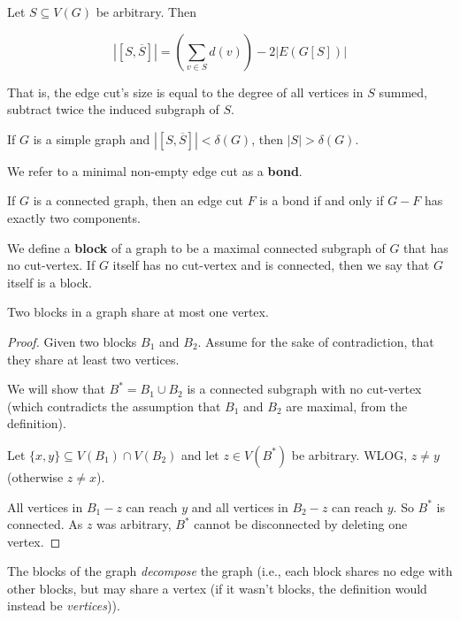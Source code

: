 \begin{proposition}
	Let $S \subseteq V(G)$ be arbitrary. Then

	\begin{equation*}
		|[S, \overline{S}]| = \left( \sum_{v \in S} d(v) \right) - 2|E(G[S])|
	\end{equation*}
\end{proposition}

That is, the edge cut's size is equal to the degree of all vertices in $S$ summed, subtract twice the induced subgraph of $S$.

\begin{corollary}
	If $G$ is a simple graph and $|[S, \overline{S}]| < \delta(G)$, then $|S| > \delta(G)$.
\end{corollary}


We refer to a minimal non-empty edge cut as a \textbf{bond}.

\begin{proposition}
	If $G$ is a connected graph, then an edge cut $F$ is a bond if and only if $G-F$ has exactly two components.
\end{proposition}

We define a \textbf{block} of a graph to be a maximal connected subgraph of $G$ that has no cut-vertex. If $G$ itself has no cut-vertex and is connected, then we say that $G$ itself is a block.

\begin{proposition}
	Two blocks in a graph share at most one vertex.
\end{proposition}

\begin{proof}
	Given two blocks $B_{1}$ and $B_{2}$. Assume for the sake of contradiction, that they share at least two vertices.

	We will show that $B^{*} = B_{1} \cup B_{2}$ is a connected subgraph with no cut-vertex (which contradicts the assumption that $B_{1}$ and $B_{2}$ are maximal, from the definition).

	Let $\{x,y\} \subseteq V(B_{1}) \cap V(B_{2})$ and let $z \in V(B^{*})$ be arbitrary. WLOG, $z \ne y$ (otherwise $z \ne x$).

	All vertices in $B_{1}-z$ can reach $y$ and all vertices in $B_{2}-z$ can reach $y$. So $B^{*}$ is connected. As $z$ was arbitrary, $B^{*}$ cannot be disconnected by deleting one vertex.
\end{proof}

The blocks of the graph \textit{decompose} the graph (i.e., each block shares no edge with other blocks, but may share a vertex (if it wasn't blocks, the definition would instead be \textit{vertices})).

